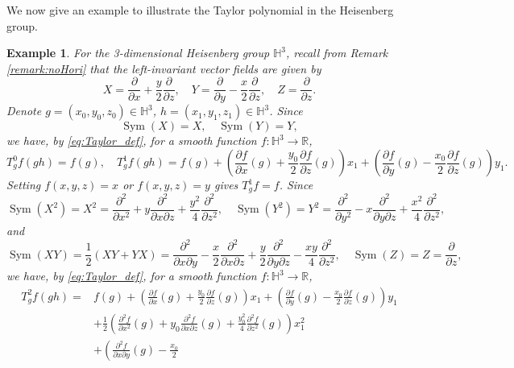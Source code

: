\documentclass[11pt,reqno]{amsart}
\newtheorem{example}[theorem]{Example}
\newcommand{\1}{\mathbf 1}
\begin{document}
We now give an example to illustrate the Taylor polynomial in the Heisenberg group.
\begin{example}
        For the 3-dimensional Heisenberg group $\mathbb{H}^3$, recall from Remark \ref{remark:noHori} that the left-invariant vector fields are given by
        \[
X=\frac{\partial}{\partial x}+\frac{y}{2} \frac{\partial}{\partial z},\quad Y=\frac{\partial}{\partial y}-\frac{x}{2} \frac{\partial}{\partial z},\quad Z=\frac{\partial}{\partial z}.
\]
Denote $g=\left(x_0,y_0,z_0\right)\in \mathbb{H}^3$, $h=\left(x_1,y_1,z_1\right)\in\mathbb{H}^3$. Since
\[
\operatorname{Sym}\left(X\right)=X,\quad \operatorname{Sym}\left(Y\right)=Y,
\]
we have, by \eqref{eq:Taylor_def}, for a smooth function $f:\mathbb{H}^3\to \mathbb{R}$,
\[
T^0_gf\left(gh\right)=f\left(g\right),\quad T^1_gf\left(gh\right)=f\left(g\right)+\left(\frac{\partial f}{\partial x}\left(g\right)+\frac{y_0}{2} \frac{\partial f}{\partial z}\left(g\right)\right)x_1+\left(\frac{\partial f}{\partial y}\left(g\right)-\frac{x_0}{2} \frac{\partial f}{\partial z}\left(g\right)\right)y_1.
\]
Setting $f\left(x,y,z\right)=x$ or $f\left(x,y,z\right)=y$ gives $T^1_gf=f$.
Since
\[
\operatorname{Sym}\left(X^2\right)=X^2=\frac{\partial^2}{\partial x^2}+y\frac{\partial^2}{\partial x \partial z}+\frac{y^2}{4}\frac{\partial^2}{\partial z^2},\quad \operatorname{Sym}\left(Y^2\right)=Y^2=\frac{\partial^2}{\partial y^2}-x\frac{\partial^2}{\partial y \partial z}+\frac{x^2}{4}\frac{\partial^2}{\partial z^2},
\]
and
\[
\operatorname{Sym}\left(XY\right)=\frac 12\left(XY+YX\right)=\frac{\partial^2}{\partial x\partial y}-\frac x2
\frac{\partial^2}{\partial x\partial z}+\frac y2\frac{\partial^2}{\partial y \partial z}-\frac{xy}{4}\frac{\partial^2}{\partial z^2},\quad \operatorname{Sym}\left(Z\right)=Z=\frac{\partial}{\partial z},
\]
we have, by \eqref{eq:Taylor_def}, for a smooth function $f:\mathbb{H}^3\to \mathbb{R}$,
\begin{align*}
T^2_gf\left(gh\right)=&f\left(g\right)+\left(\frac{\partial f}{\partial x}\left(g\right)+\frac{y_0}{2} \frac{\partial f}{\partial z}\left(g\right)\right)x_1+\left(\frac{\partial f}{\partial y}\left(g\right)-\frac{x_0}{2} \frac{\partial f}{\partial z}\left(g\right)\right)y_1\\
&+\frac 12 \left(\frac{\partial^2f}{\partial x^2}\left(g\right)+y_0\frac{\partial^2f}{\partial x \partial z}\left(g\right)+\frac{y_0^2}{4}\frac{\partial^2f}{\partial z^2}\left(g\right)\right)x_1^2\\
&+\left(\frac{\partial^2f}{\partial x\partial y}\left(g\right)-\frac {x_0}2

\end{align*}
\end{example}
\end{document}
